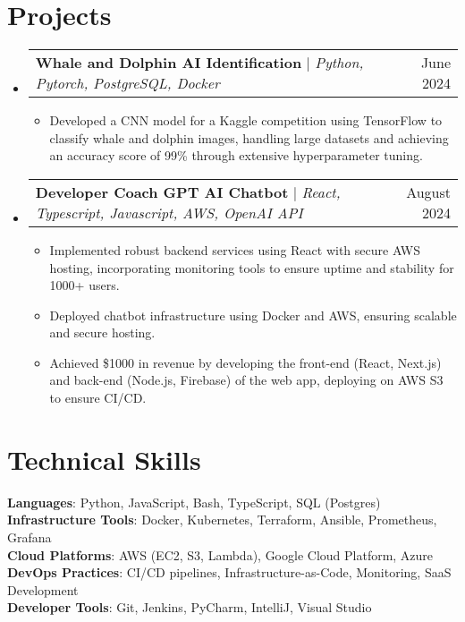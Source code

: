 \documentclass[letterpaper,11pt]{article}
\makeatletter
\newcommand{\resumeItem}[1]{
  \item\small{
    {#1 \vspace{-2pt}}
  }
}
\newcommand{\resumeProjectHeading}[2]{
    \item
    \begin{tabular*}{0.97\textwidth}{l@{\extracolsep{\fill}}r}
      \small#1 & #2 \\
    \end{tabular*}\vspace{-7pt}
}
\newcommand{\resumeSubHeadingListStart}{\begin{itemize}[leftmargin=0.15in, label={}]}
\newcommand{\resumeSubHeadingListEnd}{\end{itemize}}
\newcommand{\resumeItemListStart}{\begin{itemize}}
\newcommand{\resumeItemListEnd}{\end{itemize}\vspace{-5pt}}
\makeatother
\begin{document}
\section{Projects}
    \resumeSubHeadingListStart
      \resumeProjectHeading
          {\textbf{Whale and Dolphin AI Identification} $|$ \emph{Python, Pytorch,  PostgreSQL, Docker}}{June 2024}
          \resumeItemListStart
            \resumeItem{Developed a CNN model for a Kaggle competition using TensorFlow to classify whale and dolphin images,  handling large datasets and achieving an accuracy score of 99\% through extensive hyperparameter tuning.}
          \resumeItemListEnd
      \resumeProjectHeading
          {\textbf{Developer Coach GPT AI Chatbot} $|$ \emph{React, Typescript, Javascript, AWS, OpenAI API}}{August 2024}
          \resumeItemListStart
            \resumeItem{Implemented robust backend services using React with secure AWS hosting, incorporating monitoring tools to ensure uptime and stability for 1000+ users.}
            \resumeItem{Deployed chatbot infrastructure using Docker and AWS, ensuring scalable and secure hosting.}
            \resumeItem{Achieved \$1000 in revenue by developing the front-end (React, Next.js) and back-end (Node.js, Firebase) of the web app, deploying on AWS S3 to ensure CI/CD.}
          \resumeItemListEnd   
    \resumeSubHeadingListEnd



%
\section{Technical Skills}
\begin{itemize}[leftmargin=0.15in, label={}]
    \small{\item{
     \textbf{Languages}{: Python, JavaScript, Bash, TypeScript, SQL (Postgres)} \\
     \textbf{Infrastructure Tools}{: Docker, Kubernetes, Terraform, Ansible, Prometheus, Grafana} \\
     \textbf{Cloud Platforms}{: AWS (EC2, S3, Lambda), Google Cloud Platform, Azure} \\
     \textbf{DevOps Practices}{: CI/CD pipelines, Infrastructure-as-Code, Monitoring, SaaS Development} \\
     \textbf{Developer Tools}{: Git, Jenkins, PyCharm, IntelliJ, Visual Studio}
    }}
\end{itemize}
\end{document}
